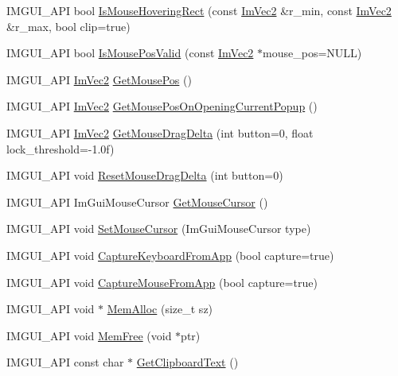 \begin{DoxyCompactItemize}
\item 
I\+M\+G\+U\+I\+\_\+\+A\+PI bool \hyperlink{namespace_im_gui_ae0b8ea0e06c457316d6aed6c5b2a1c25}{Is\+Mouse\+Hovering\+Rect} (const \hyperlink{struct_im_vec2}{Im\+Vec2} \&r\+\_\+min, const \hyperlink{struct_im_vec2}{Im\+Vec2} \&r\+\_\+max, bool clip=true)
\item 
I\+M\+G\+U\+I\+\_\+\+A\+PI bool \hyperlink{namespace_im_gui_a22d482190e8f549d5904aded1c6f7778}{Is\+Mouse\+Pos\+Valid} (const \hyperlink{struct_im_vec2}{Im\+Vec2} $\ast$mouse\+\_\+pos=N\+U\+LL)
\item 
I\+M\+G\+U\+I\+\_\+\+A\+PI \hyperlink{struct_im_vec2}{Im\+Vec2} \hyperlink{namespace_im_gui_abf11873349874c5d302861583c00d451}{Get\+Mouse\+Pos} ()
\item 
I\+M\+G\+U\+I\+\_\+\+A\+PI \hyperlink{struct_im_vec2}{Im\+Vec2} \hyperlink{namespace_im_gui_ac1ba5d7b76e11d47660b32dc851afd2f}{Get\+Mouse\+Pos\+On\+Opening\+Current\+Popup} ()
\item 
I\+M\+G\+U\+I\+\_\+\+A\+PI \hyperlink{struct_im_vec2}{Im\+Vec2} \hyperlink{namespace_im_gui_a94b8aecab8a4128145fea1ad7d381197}{Get\+Mouse\+Drag\+Delta} (int button=0, float lock\+\_\+threshold=-\/1.\+0f)
\item 
I\+M\+G\+U\+I\+\_\+\+A\+PI void \hyperlink{namespace_im_gui_aa03f31a184cafdf506feb2e8ba07f91e}{Reset\+Mouse\+Drag\+Delta} (int button=0)
\item 
I\+M\+G\+U\+I\+\_\+\+A\+PI Im\+Gui\+Mouse\+Cursor \hyperlink{namespace_im_gui_a3b955bb840a2411f7c19ac6687d57392}{Get\+Mouse\+Cursor} ()
\item 
I\+M\+G\+U\+I\+\_\+\+A\+PI void \hyperlink{namespace_im_gui_ae212a3516efcba50a684df202c8e63ad}{Set\+Mouse\+Cursor} (Im\+Gui\+Mouse\+Cursor type)
\item 
I\+M\+G\+U\+I\+\_\+\+A\+PI void \hyperlink{namespace_im_gui_af382f9360d73917a9e9c0d26b5797552}{Capture\+Keyboard\+From\+App} (bool capture=true)
\item 
I\+M\+G\+U\+I\+\_\+\+A\+PI void \hyperlink{namespace_im_gui_a3a86fbf0d334b30dc16fb44955f1ce54}{Capture\+Mouse\+From\+App} (bool capture=true)
\item 
I\+M\+G\+U\+I\+\_\+\+A\+PI void $\ast$ \hyperlink{namespace_im_gui_a15efb2cac4a54b35489c5984ba1b661a}{Mem\+Alloc} (size\+\_\+t sz)
\item 
I\+M\+G\+U\+I\+\_\+\+A\+PI void \hyperlink{namespace_im_gui_a269ec695c6e722ec3da85dae37f0675d}{Mem\+Free} (void $\ast$ptr)
\item 
I\+M\+G\+U\+I\+\_\+\+A\+PI const char $\ast$ \hyperlink{namespace_im_gui_a11837daee819fd90e17d80ab1eef1f99}{Get\+Clipboard\+Text} ()

\end{DoxyCompactItemize}
